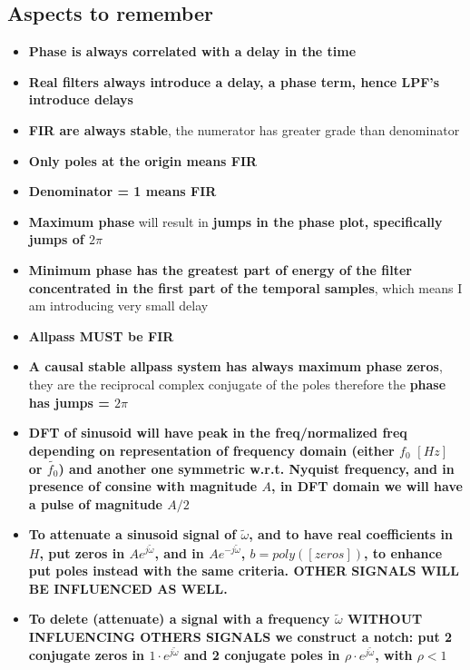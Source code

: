 \subsection{Aspects to remember}
\begin{itemize}
    \item \textbf{Phase is always correlated with a delay in the time}
    \item \textbf{Real filters always introduce a delay, a phase term, hence LPF's introduce delays}
    \item \textbf{FIR are always stable}, the numerator has greater grade than denominator
    \item \textbf{Only poles at the origin means FIR}
    \item \textbf{Denominator = 1 means FIR}
    \item \textbf{Maximum phase} will result in \textbf{jumps in the phase plot, specifically jumps of $2\pi$}
    \item \textbf{Minimum phase has the greatest part of energy of the filter concentrated in the first part of the temporal samples}, which means I am introducing very small delay
    \item \textbf{Allpass MUST be FIR}
    \item \textbf{A causal stable allpass system has always maximum phase
    zeros}, they are the reciprocal complex conjugate of the poles therefore the \textbf{phase has jumps = $2\pi$}
    \item \textbf{DFT of sinusoid will have peak in the freq/normalized freq depending on representation of frequency domain (either $f_0\,\,[Hz]$ or $\tilde{f_0}$) and another one symmetric w.r.t. Nyquist frequency, and in presence of consine with magnitude $A$, in DFT domain we will have a pulse of magnitude $A/2$}
    \item \textbf{To attenuate a sinusoid signal of $\tilde{\omega}$, and to have real coefficients in $H$, put zeros in $Ae^{j\tilde{\omega}}$, and in $Ae^{-j\tilde{\omega}}$, $b=poly([zeros])$, to enhance put poles instead with the same criteria. OTHER SIGNALS WILL BE INFLUENCED AS WELL.}
    \item \textbf{To delete (attenuate) a signal with a frequency $\tilde{\omega}$ WITHOUT INFLUENCING OTHERS SIGNALS we construct a notch: put 2 conjugate zeros in $1\cdot e^{j\tilde{\omega}}$ and 2 conjugate poles in $\rho\cdot e^{j\tilde{\omega}}$, with $\rho<1$} 
\end{itemize}